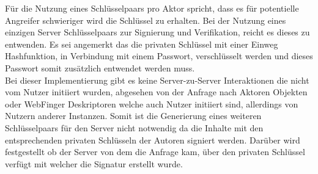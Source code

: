 Für die Nutzung eines Schlüsselpaars pro Aktor spricht, dass es für potentielle Angreifer schwieriger wird die Schlüssel zu erhalten. Bei der Nutzung eines einzigen Server Schlüsselpaars zur Signierung und Verifikation, reicht es dieses zu entwenden. Es sei angemerkt das die privaten Schlüssel mit einer Einweg Hashfunktion, in Verbindung mit einem Passwort, verschlüsselt werden und dieses Passwort somit zusätzlich entwendet werden muss.\\

Bei dieser Implementierung gibt es keine Server-zu-Server Interaktionen die nicht vom Nutzer initiiert wurden, abgesehen von der Anfrage nach Aktoren Objekten oder WebFinger Deskriptoren welche auch Nutzer initiiert sind, allerdings von Nutzern anderer Instanzen. Somit ist die Generierung eines weiteren Schlüsselpaars für den Server nicht notwendig da die Inhalte mit den entsprechenden privaten Schlüsseln der Autoren signiert werden. Darüber wird festgestellt ob der Server von dem die Anfrage kam, über den privaten Schlüssel verfügt mit welcher die Signatur erstellt wurde.